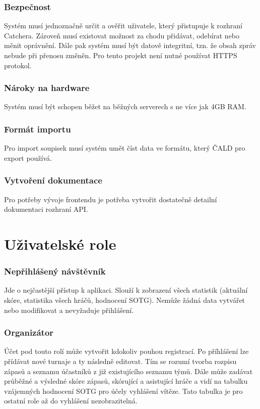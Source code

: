 \subsubsection*{Bezpečnost}
Systém musí jednoznačně určit a ověřit uživatele, který přistupuje k rozhraní Catchera. Zároveň
musí existovat možnost za chodu přidávat, odebírat nebo měnit oprávnění. Dále pak systém musí
být datově integritní, tzn. že obsah zpráv nebude při přenosu změněn. Pro tento projekt není
nutné používat HTTPS protokol.

\subsubsection*{Nároky na hardware}
Systém musí být schopen běžet na běžných serverech s ne více jak 4GB RAM.

\subsubsection*{Formát importu}
Pro import soupisek musí systém umět číst data ve formátu, který ČALD pro export používá.

\subsubsection*{Vytvoření dokumentace}
Pro potřeby vývoje frontendu je potřeba vytvořit dostatečně detailní dokumentaci rozhraní API.

\section{Uživatelské role}

\subsubsection*{Nepřihlášený návštěvník}

Jde o nejčastější přístup k aplikaci. Slouží k zobrazení všech statistik (aktuální skóre,
statistika všech hráčů, hodnocení SOTG). Nemůže žádná data vytvářet nebo modifikovat
a nevyžaduje přihlášení.
  
\subsubsection*{Organizátor}

Účet pod touto rolí může vytvořit kdokoliv pouhou registrací. Po příhlášení lze přídávat
nové turnaje a ty následně editovat. Tím se rozumí tvorba rozpisu zápasů a seznamu účastníků
z již existujícího seznamu týmů. Dále může zadávat průběžné a výsledné skóre zápasů,
skórující a asistující hráče a vidí na tabulku vzájemných hodnocení SOTG pro účely vyhlášení
vítěze. Tato tabulka je pro ostatní role až do vyhlášení nezobrazitelná.

